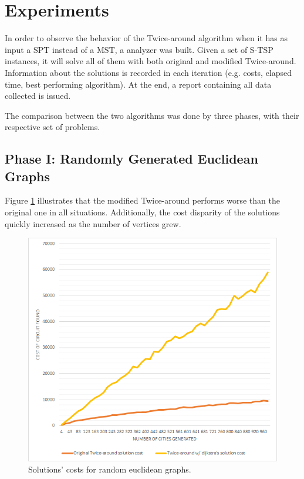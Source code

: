 \documentclass[journal]{IEEEtran}
\begin{document}
\section{Experiments}

In order to observe the behavior of the Twice-around algorithm when it has as input a SPT instead of a MST, a analyzer was built. Given a set of S-TSP instances, it will solve all of them with both original and modified Twice-around. Information about the solutions is recorded in each iteration (e.g. costs, elapsed time, best performing algorithm). At the end, a report containing all data collected is issued.

The comparison between the two algorithms was done by three phases, with their respective set of problems.

\subsection{Phase I: Randomly Generated Euclidean Graphs}

Figure \ref{fig:ctreg} illustrates that the modified Twice-around performs worse than the original one in all situations. Additionally, the cost disparity of the solutions quickly increased as the number of vertices grew.

\begin{figure}[H]
	\centering
	\includegraphics[width=.95\linewidth]{comparison-ta-random-euclidean-graphs}
	\caption{Solutions' costs for random euclidean graphs.}
	\label{fig:ctreg}
\end{figure}
\end{document}
